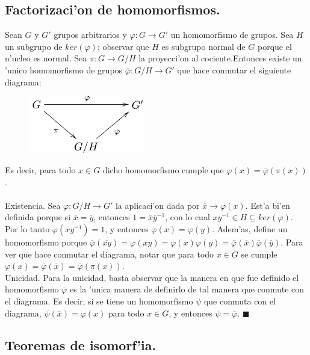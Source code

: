 \documentclass[a4paper,openright,12pt]{book}
\numberwithin{equation}{section} %
\newenvironment{proof}{\noindent{\it Demostracion:}}{\hfill$\blacksquare$} %
\begin{document}
\subsection{Factorizaci'on de homomorfismos.}
Sean $G$ y $G'$ grupos arbitrarios y $\varphi:G\rightarrow G'$ un homomorfismo de grupos. Sea $H$ un subgrupo de $ker(\varphi)$; observar que $H$ es subgrupo normal de $G$ porque el n'ucleo es normal. Sea $\pi:G \rightarrow G/H$ la proyecci'on al cociente.Entonces existe un 'unico homomorfismo de grupos $\overline{\varphi}:G/H \rightarrow G'$ que hace conmutar el siguiente diagrama:
\begin{figure}[H]
\centering
\includegraphics[width=5cm]{./factorizacion.png}
\end{figure}
Es decir, para todo $x \in G $ dicho homomorfismo cumple que $\varphi(x)=\overline{\varphi}(\pi(x))$.
\\
\\
\begin{proof}
Existencia. Sea $\varphi:G/H \rightarrow G'$ la aplicaci'on dada por $\overline{x}\rightarrow \varphi(x)$. Est'a bi'en definida porque si $\overline{x}=\overline{y}$, entonces $1=\overline{x}\overline{y}^{-1}$, con lo cual $xy^{-1}\in H \subseteq ker(\varphi)$. Por lo tanto $\varphi(xy^{-1})=1$, y entonces $\varphi(x)=\varphi(y)$. Adem'as, define un homomorfismo porque $\overline{\varphi}(\overline{xy})=\varphi(xy)=\varphi(x)\varphi(y)=\overline{\varphi}(\overline{x})\overline{\varphi}(\overline{y})$. Para ver que hace conmutar el diagrama, notar que para todo $x \in G$ se cumple $\varphi(x)=\overline{\varphi}(\overline{x})=\overline{\varphi}(\pi(x))$.\\
Unicidad. Para la unicidad, basta observar que la manera en que fue definido el homomorfismo $\overline{\varphi}$ es la 'unica manera de definirlo de tal manera que conmute con el diagrama. Es decir, si se tiene un homomorfismo $\psi$ que conmuta con el diagrama, $\psi(\overline{x})=\varphi(x)$ para todo $x \in G$, y entonces $\psi = \overline{\varphi}$.
\end{proof}

\subsection{Teoremas de isomorf'ia.}
\end{document}
